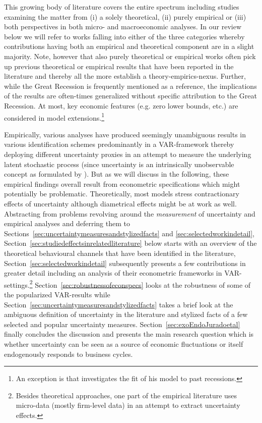\documentclass[a4paper,11pt,listof=nochaptergap,oneside,pointednumbers,bibtotoc,bigheadings,liststotoc,hidelinks]{scrbook}
\theoremstyle{mysatz}
\theoremstyle{mydefinition}
\theoremstyle{mytheorem}
\theoremstyle{mybemerkung}
\begin{document}
This growing body of literature covers the entire spectrum including studies examining the matter from (i) a solely theoretical, (ii) purely empirical or (iii) both perspectives in both micro- and macroeconomic analyses. In our review below we will refer to works falling into either of the three categories whereby contributions having both an empirical and theoretical component are in a slight majority.  Note, however that also purely theoretical or empirical works often pick up previous theoretical or empirical results that have been reported in the literature and thereby all the more establish a theory-empirics-nexus. Further, while the Great Recession is frequently mentioned as a reference, the implications of the results are often-times generalized without specific attribution to the Great Recession. At most, key economic features (e.g. zero lower bounds, etc.) are considered in model extensions.\footnote{An exception is \citet{schaal:17} that investigates the fit of his model to past recessions.} 

Empirically, various analyses have produced seemingly unambiguous results in various identification schemes predominantly in a VAR-framework thereby deploying different uncertainty proxies in an attempt to measure the underlying latent stochastic process (since uncertainty is an intrinsically unobservable concept as formulated by \citealp{bloom:14}). But as we will discuss in the following, these empirical findings overall result from econometric specifications which might potentially be problematic. Theoretically, most models stress contractionary effects of uncertainty although diametrical effects might be at work as well. Abstracting from problems revolving around the \textit{measurement} of uncertainty and empirical analyses and deferring them to Sections~\ref{sec:uncertaintymeasuresandstylizedfacts} and \ref{sec:selectedworkindetail}, Section~\ref{sec:studiedeffectsinrelatedliterature} below starts with an overview of the theoretical behavioural channels that have been identified in the literature, Section~\ref{sec:selectedworkindetail} subsequently presents a few contributions in greater detail including an analysis of their econometric frameworks in VAR-settings.\footnote{Besides theoretical approaches, one part of the empirical literature uses micro-data (mostly firm-level data) in an attempt to extract uncertainty effects.} Section~\ref{sec:robustnessofeconspecs} looks at the robustness of some of the popularized VAR-results while Section~\ref{sec:uncertaintymeasuresandstylizedfacts} takes a brief look at the ambiguous definition of uncertainty in the literature and stylized facts of a few selected and popular uncertainty measures. Section~\ref{sec:exoEndoJuradoetal} finally concludes the discussion and presents the main research question which is whether uncertainty can be seen as a source of economic fluctuations or itself endogenously responds to business cycles.
\end{document}
